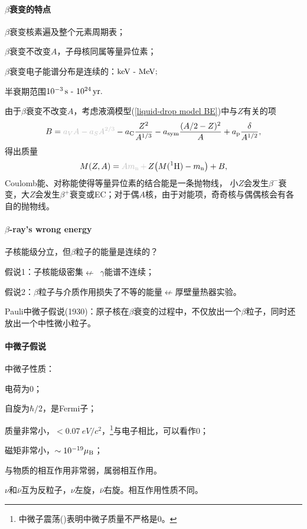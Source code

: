 \paragraph{$\beta$衰变的特点}
\begin{compactenum}
	\item $\beta$衰变核素遍及整个元素周期表；
	\item $\beta$衰变不改变$A$，子母核同属等量异位素；
	\item $\beta$衰变电子能谱分布是连续的：$\si{keV}\vs\si{MeV};$
	\item 半衰期范围$10^{-3}\,\mathrm{s}\vs\SI{e24}{yr}.$
\end{compactenum}
由于$\beta$衰变不改变$A$，考虑液滴模型(\ref{liquid-drop model BE})中与$Z$有关的项
\[
	B=\textcolor{lightgray}{a_VA-a_SA^{2/3}}-a_\mathrm C\frac{Z^2}{A^{1/3}}-a_\mathrm{sym}\frac{(A/2-Z)^2}{A}+a_\mathrm p\frac{\delta}{A^{1/2}},
\]
得出质量
\[
	M(Z,A)=\textcolor{lightgray}{Am_\nton\,+\,}Z\bigkh{M(\nucli1H)-m_\nton}+B,
\]
Coulomb能、对称能使得等量异位素的结合能是一条抛物线，%
小$Z$会发生$\beta^-$衰变，大$Z$会发生$\beta^+$衰变或EC；对于偶$A$核，由于对能项，奇奇核与偶偶核会有各自的抛物线。

\paragraph{$\beta$-ray's wrong energy}子核能级分立，但$\beta$粒子的能量是连续的？
\begin{compactitem}
	\item 假说1：子核能级密集$\nleftarrow$~$\gamma$能谱不连续；
	\item 假说2：$\beta$粒子与介质作用损失了不等的能量$\nleftarrow$厚壁量热器实验。
\end{compactitem}
Pauli中微子假说(1930)：原子核在$\beta$衰变的过程中，不仅放出一个$\beta$粒子，同时还放出一个中性微小粒子。
\paragraph{中微子假说}中微子性质：
\begin{compactenum}
	\item 电荷为0；
	\item 自旋为$\hbar/2$，是Fermi子；
	\item 质量非常小，\href{https://www.sciencedirect.com/topics/chemistry/electron-neutrino}{$<\SI{0.07}{eV}/c^2$}，\footnote{中微子震荡()表明中微子质量不严格是0。}与电子相比，可以看作0；
	\item 磁矩非常小，\href{https://arxiv.org/ftp/arxiv/papers/1506/1506.01284.pdf}{$\sim 10^{-19}\muB$}；
	\item 与物质的相互作用非常弱，属弱相互作用。
\end{compactenum}
$\nu$和$\bar\nu$互为反粒子，$\nu$左旋，$\bar\nu$右旋。相互作用性质不同。
